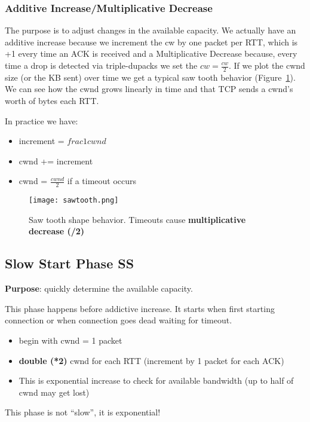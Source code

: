 \subsubsection{Additive Increase/Multiplicative Decrease}

The purpose is to adjust changes in the available capacity.
We actually have an additive increase because we increment the cw by one packet
per RTT, which is +1 every time an ACK is received and a Multiplicative Decrease
because, every time a drop is detected via triple-dupacks we set the
$cw=\frac{cw}{2}$. If we plot the cwnd size (or the KB sent) over time we get a
typical saw tooth behavior (Figure~\ref{fig:tcp:sawtooth}). We can see how the
cwnd grows linearly in time and that TCP sends a cwnd's worth of bytes each RTT.

In practice we have:
\begin{itemize}
  \item increment = $frac{1}{cwnd}$
  \item cwnd += increment
  \item cwnd = $\frac{cwnd}{2}$ if a timeout occurs
\end{itemize}

\begin{figure}[t]
\texttt{[image: sawtooth.png]}
\caption[Saw tooth shape behavior]{Saw tooth shape behavior. Timeouts cause
  \textbf{multiplicative decrease (/2)}}
\label{fig:tcp:sawtooth}
\end{figure}

\subsection{Slow Start Phase SS}

\textbf{Purpose}: quickly determine the available capacity.

\noindent This phase happens before addictive increase. It starts when first
starting connection or when connection goes dead waiting for timeout.

\begin{itemize}
\item begin with cwnd = 1 packet
\item \textbf{double (*2)} cwnd for each RTT (increment by 1 packet for each
  ACK)
\item This is exponential increase to check for available bandwidth (up to half
  of cwnd may get lost)
\end{itemize}

This phase is not ``slow'', it is exponential!

